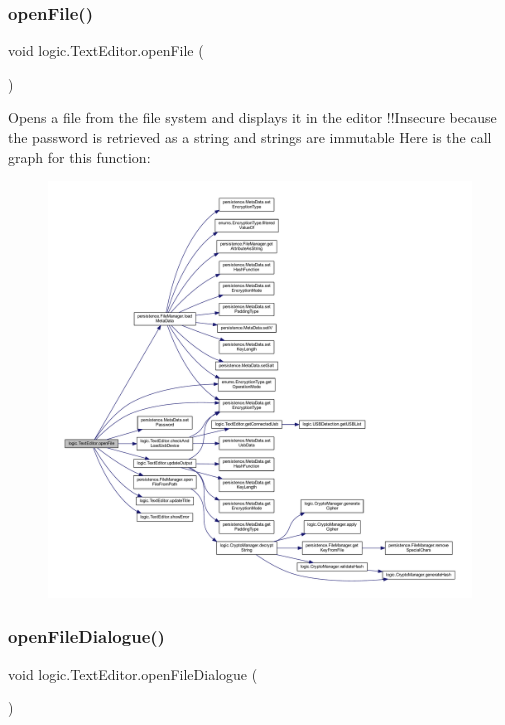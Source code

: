 \subsubsection{\texorpdfstring{open\+File()}{openFile()}}
{\footnotesize\ttfamily void logic.\+Text\+Editor.\+open\+File (\begin{DoxyParamCaption}{ }\end{DoxyParamCaption})\hspace{0.3cm}{\ttfamily [private]}}

Opens a file from the file system and displays it in the editor !!\+Insecure because the password is retrieved as a string and strings are immutable Here is the call graph for this function\+:\nopagebreak
\begin{figure}[H]
\begin{center}
\leavevmode
\includegraphics[width=350pt]{classlogic_1_1_text_editor_a52437fbd2159a657602a75860c18051f_cgraph}
\end{center}
\end{figure}
\mbox{\label{classlogic_1_1_text_editor_ae6690cbd84b9162df386bb319690a810}} 
\subsubsection{\texorpdfstring{open\+File\+Dialogue()}{openFileDialogue()}}
{\footnotesize\ttfamily void logic.\+Text\+Editor.\+open\+File\+Dialogue (\begin{DoxyParamCaption}{ }\end{DoxyParamCaption})}

